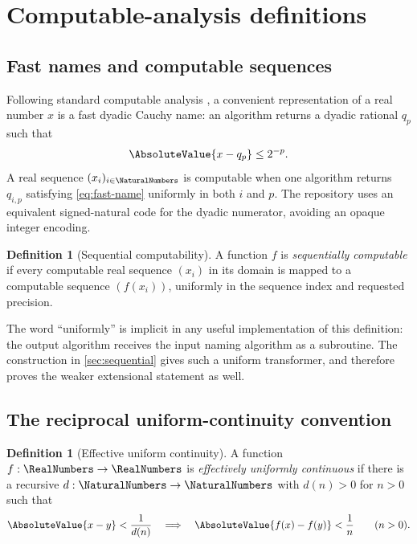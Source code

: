 \documentclass[11pt,oneside]{article}
\theoremstyle{definition}
\newtheorem{definition}[theorem]{Definition}
\theoremstyle{remark}
\numberwithin{equation}{section}
\begin{document}
\section{Computable-analysis definitions}

\subsection{Fast names and computable sequences}

Following standard computable analysis \cite{G1957,Weihrauch2000,PourElRichards1989}, a convenient representation of a real number $x$ is a fast dyadic Cauchy
name: an algorithm returns a dyadic rational $q_p$ such that
\begin{equation}\label{eq:fast-name}
 \AbsoluteValue{x-q_p}\le2^{-p}.
\end{equation}
A real sequence $(x_i)_{i\in\NaturalNumbers}$ is computable when one algorithm returns
$q_{i,p}$ satisfying \eqref{eq:fast-name} uniformly in both $i$ and $p$.
The repository uses an equivalent signed-natural code for the dyadic
numerator, avoiding an opaque integer encoding.

\begin{definition}[Sequential computability]\label{def:sequential}
A function $f$ is \emph{sequentially computable} if every computable real
sequence $(x_i)$ in its domain is mapped to a computable sequence
$(f(x_i))$, uniformly in the sequence index and requested precision.
\end{definition}

The word ``uniformly'' is implicit in any useful implementation of this
definition: the output algorithm receives the input naming algorithm as a
subroutine.  The construction in \cref{sec:sequential} gives such a uniform
transformer, and therefore proves the weaker extensional statement as well.

\subsection{The reciprocal uniform-continuity convention}

\begin{definition}[Effective uniform continuity]\label{def:euc}
A function $f:\RealNumbers\to\RealNumbers$ is \emph{effectively uniformly continuous} if there
is a recursive $d:\NaturalNumbers\to\NaturalNumbers$ with $d(n)>0$ for $n>0$ such that
\begin{equation}\label{eq:euc-def}
 \AbsoluteValue{x-y}<\frac1{d(n)}
 \quad\Longrightarrow\quad
 \AbsoluteValue{f(x)-f(y)}<\frac1n
 \qquad(n>0).
\end{equation}
\end{definition}
\end{document}
